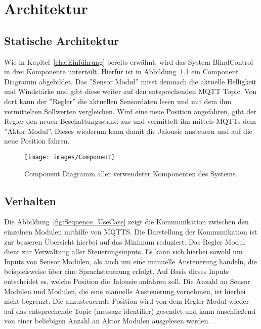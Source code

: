 \chapter{Architektur}
\label{cha:Architektur}

\section{Statische Architektur}
Wie in Kapitel~\ref{cha:Einführung} bereits erwähnt, wird das System BlindControl in drei Komponente unterteilt. Hierfür ist in Abbildung~\ref{fig:component_diagramm} ein Component Diagramm abgebildet. Das ''Sensor Modul'' misst demnach die aktuelle Helligkeit und Windstärke und gibt diese weiter auf den entsprechenden MQTT Topic. Von dort kann der ''Regler'' die aktuellen Sensordaten lesen und mit dem ihm vermittelten Sollwerten vergleichen. Wird eine neue Position angefahren, gibt der Regler den neuen Beschattungsstand aus und vermittelt ihn mittels MQTTs dem ''Aktor Modul''. Dieses wiederum kann damit die Jalousie ansteuern und auf die neue Position fahren.
\begin{figure}[hbt]
	\centering
	\texttt{[image: images/Component]}
	\caption[Component Diagramm]{Component Diagramm aller verwendeter Komponenten des Systems.}
	\label{fig:component_diagramm}
\end{figure}

\section{Verhalten}
Die Abbildung~\ref{fig:Sequence_UseCase} zeigt die Kommunikation zwischen den einzelnen Modulen mithilfe von MQTTS. Die Darstellung der Kommunikation ist zur besseren Übersicht hierbei auf das Minimum reduziert. Das Regler Modul dient zur Verwaltung aller Steuerungsinputs. Es kann sich hierbei sowohl um Inputs von Sensor Modulen, als auch um eine manuelle Ansteuerung handeln, die beispielsweise über eine Sprachsteuerung erfolgt. Auf Basis dieses Inputs entscheidet es, welche Position die Jalousie anfahren soll. Die Anzahl an Sensor Modulen und Modulen, die eine manuelle Ansteuerung vornehmen, ist hierbei nicht begrenzt. Die anzusteuernde Position wird von dem Regler Modul wieder auf das entsprechende Topic (message identifier) gesendet und kann anschließend von einer beliebigen Anzahl an Aktor Modulen ausgelesen werden.

